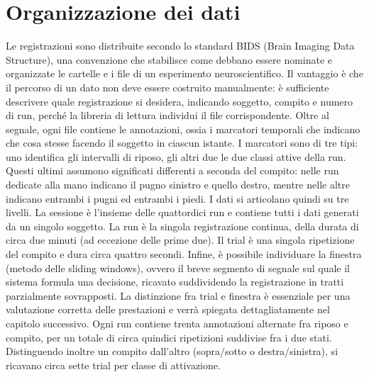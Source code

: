 \section{Organizzazione dei dati}
Le registrazioni sono distribuite secondo lo standard BIDS (Brain Imaging Data Structure), una convenzione che stabilisce come debbano essere nominate e organizzate le cartelle e i file di un esperimento neuroscientifico. Il vantaggio è che il percorso di un dato non deve essere costruito manualmente: è sufficiente descrivere quale registrazione si desidera, indicando soggetto, compito e numero di run, perché la libreria di lettura individui il file corrispondente. 
Oltre al segnale, ogni file contiene le annotazioni, ossia i marcatori temporali che indicano che cosa stesse facendo il soggetto in ciascun istante. I marcatori sono di tre tipi: uno identifica gli intervalli di riposo, gli altri due le due classi attive della run. Questi ultimi assumono significati differenti a seconda del compito: nelle run dedicate alla mano indicano il pugno sinistro e quello destro, mentre nelle altre indicano entrambi i pugni ed entrambi i piedi.
I dati si articolano quindi su tre livelli. La sessione è l'insieme delle quattordici run e contiene tutti i dati generati da un singolo soggetto. La run è la singola registrazione continua, della durata di circa due minuti (ad eccezione delle prime due). Il trial è una singola ripetizione del compito e dura circa quattro secondi. Infine, è possibile individuare la finestra (metodo delle sliding windows), ovvero il breve segmento di segnale sul quale il sistema formula una decisione, ricavato suddividendo la registrazione in tratti parzialmente sovrapposti. La distinzione fra trial e finestra è essenziale per una valutazione corretta delle prestazioni e verrà spiegata dettagliatamente nel capitolo successivo.
Ogni run contiene trenta annotazioni alternate fra riposo e compito, per un totale di circa quindici ripetizioni suddivise fra i due stati. Distinguendo inoltre un compito dall'altro (sopra/sotto o destra/sinistra), si ricavano circa sette trial per classe di attivazione.

